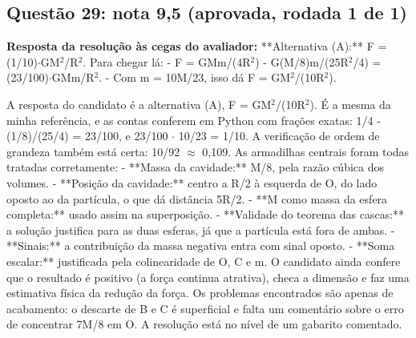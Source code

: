 \documentclass{article}%
\begin{document}
\subsection*{Questão 29: nota 9,5 (aprovada, rodada 1 de 1)}%
\textbf{Resposta da resolução às cegas do avaliador:} **Alternativa (A):** F = (1/10)$\cdot$GM$^2$/R$^2$.\newline%
\newline%
Para chegar lá:\newline%
{-} F = GMm/(4R$^2$) - G(M/8)m/(25R$^2$/4) = (23/100)$\cdot$GMm/R$^2$.\newline%
{-} Com m = 10M/23, isso dá F = GM$^2$/(10R$^2$).\par %
A resposta do candidato é a alternativa (A), F = GM$^2$/(10R$^2$). É a mesma da minha referência, e as contas conferem em Python com frações exatas: 1/4 - (1/8)/(25/4) = 23/100, e 23/100 $\cdot$ 10/23 = 1/10. A verificação de ordem de grandeza também está certa: 10/92 $\approx$ 0,109.\newline%
\newline%
As armadilhas centrais foram todas tratadas corretamente:\newline%
{-} **Massa da cavidade:** M/8, pela razão cúbica dos volumes.\newline%
{-} **Posição da cavidade:** centro a R/2 à esquerda de O, do lado oposto ao da partícula, o que dá distância 5R/2.\newline%
{-} **M como massa da esfera completa:** usado assim na superposição.\newline%
{-} **Validade do teorema das cascas:** a solução justifica para as duas esferas, já que a partícula está fora de ambas.\newline%
{-} **Sinais:** a contribuição da massa negativa entra com sinal oposto.\newline%
{-} **Soma escalar:** justificada pela colinearidade de O, C e m.\newline%
\newline%
O candidato ainda confere que o resultado é positivo (a força continua atrativa), checa a dimensão e faz uma estimativa física da redução da força. Os problemas encontrados são apenas de acabamento: o descarte de B e C é superficial e falta um comentário sobre o erro de concentrar 7M/8 em O. A resolução está no nível de um gabarito comentado.%
\end{document}
